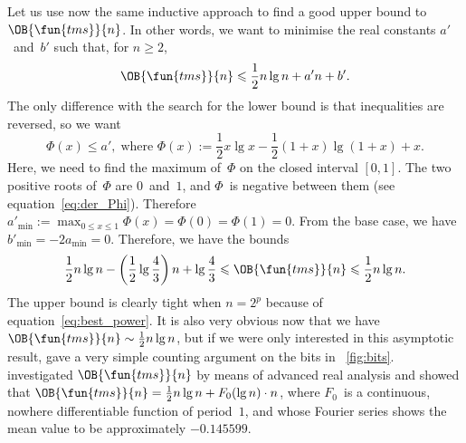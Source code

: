 Let us use now the same inductive approach to find a good upper bound
to \(\OB{\fun{tms}}{n}\). In other words, we want to minimise the real
constants \(a'\)~and~\(b'\) such that, for \(n \geqslant 2\),
\begin{equation*}
\OB{\fun{tms}}{n} \leqslant \frac{1}{2}n\lg n + a'n + b'.
\end{equation*}
The only difference with the search for the lower bound is that
inequalities are reversed, so we want
\begin{equation*}
\Phi(x) \leqslant a', \;\text{where \(\Phi(x) := \frac{1}{2}x\lg x - \frac{1}{2}(1+x)\lg(1+x) + x\)}.
\end{equation*}
Here, we need to find the maximum of~\(\Phi\) on the closed interval
\([0,1]\). The two positive roots of~\(\Phi\) are \(0\)~and~\(1\), and
\(\Phi\)~is negative between them (see
equation~\eqref{eq:der_Phi}). Therefore \(a'_{\min} := \max_{0
  \leqslant x \leqslant 1}\Phi(x) = \Phi(0) = \Phi(1) = 0\). From the
base case, we have \(b'_{\min} = -2a_{\min} = 0\). Therefore, we have
the bounds
\begin{equation}
\frac{1}{2}n\lg n - \left(\frac{1}{2}\lg\frac{4}{3}\right)n + \lg\frac{4}{3}
\leqslant \OB{\fun{tms}}{n} \leqslant \frac{1}{2}n\lg n.
\label{ineq:bounds_Btms}
\index{tms@$\OB{\fun{tms}}{n}$}
\end{equation}
The upper bound is clearly tight when \(n=2^p\) because of
equation~\eqref{eq:best_power}. It is also very obvious now that we
have \(\OB{\fun{tms}}{n} \sim \frac{1}{2}n\lg n\), but if we were only
interested in this asymptotic result, \cite{Bush_1940} gave a very
simple counting argument on the bits in \fig~\vref{fig:bits}.
\cite{Delange_1975} investigated \(\OB{\fun{tms}}{n}\) by means of
advanced real analysis and showed that \(\OB{\fun{tms}}{n} =
\tfrac{1}{2}n\lg n + F_0(\lg n) \cdot n\), where \(F_0\)~is a
continuous, nowhere differentiable function of period~\(1\), and whose
Fourier series shows the mean value to be approximately
\(-0.145599\). 

\label{tms:maximum}

